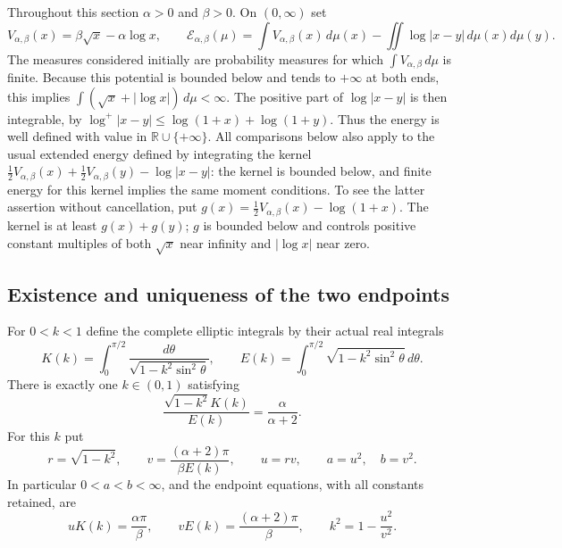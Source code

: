 \documentclass[11pt,a4paper]{article}
\begin{document}
Throughout this section $\alpha>0$ and $\beta>0$.  On $(0,\infty)$ set
\begin{equation}\tag{EIQ1}
 V_{\alpha,\beta}(x)=\beta\sqrt{x}-\alpha\log x,
 \qquad
 \mathcal E_{\alpha,\beta}(\mu)
 =\int V_{\alpha,\beta}(x)\,d\mu(x)
       -\iint\log|x-y|\,d\mu(x)d\mu(y).
\end{equation}
The measures considered initially are probability measures for which
$\int V_{\alpha,\beta}\,d\mu$ is finite.  Because this potential is bounded
below and tends to $+\infty$ at both ends, this implies
$\int(\sqrt{x}+|\log x|)\,d\mu<\infty$.
The positive part of $\log|x-y|$ is then integrable, by
$\log^+|x-y|\leq\log(1+x)+\log(1+y)$.
Thus the energy is well defined with value in $\mathbb R\cup\{+\infty\}$.
All comparisons below also apply to the usual extended energy defined by
integrating the kernel
$\tfrac12V_{\alpha,\beta}(x)+\tfrac12V_{\alpha,\beta}(y)-\log|x-y|$:
the kernel is bounded below, and finite energy for this kernel implies the
same moment conditions.  To see the latter assertion without cancellation,
put $g(x)=\tfrac12V_{\alpha,\beta}(x)-\log(1+x)$.
The kernel is at least $g(x)+g(y)$; $g$ is bounded below and controls positive
constant multiples of both $\sqrt{x}$ near infinity and $|\log x|$ near zero.

\subsection{Existence and uniqueness of the two endpoints}
For $0<k<1$ define the complete elliptic integrals by their actual real
integrals
\begin{equation}\tag{EIQ2}
 K(k)=\int_0^{\pi/2}\frac{d\theta}
            {\sqrt{1-k^2\sin^2\theta}},\qquad
 E(k)=\int_0^{\pi/2}\sqrt{1-k^2\sin^2\theta}\,d\theta.
\end{equation}
There is exactly one $k\in(0,1)$ satisfying
\begin{equation}\tag{EIQ3}
 \frac{\sqrt{1-k^2}K(k)}{E(k)}=\frac{\alpha}{\alpha+2}.
\end{equation}
For this $k$ put
\begin{equation}\tag{EIQ4}
 r=\sqrt{1-k^2},\qquad
 v=\frac{(\alpha+2)\pi}{\beta E(k)},\qquad u=rv,
 \qquad a=u^2,\quad b=v^2.
\end{equation}
In particular $0<a<b<\infty$, and the endpoint equations, with all
constants retained, are
\begin{equation}\tag{EIQ5}
 uK(k)=\frac{\alpha\pi}{\beta},\qquad
 vE(k)=\frac{(\alpha+2)\pi}{\beta},\qquad
 k^2=1-\frac{u^2}{v^2}.
\end{equation}
\end{document}
